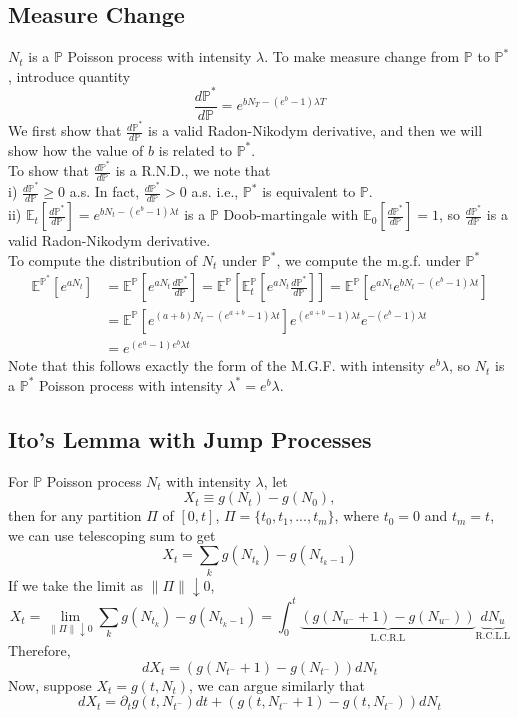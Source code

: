 \documentclass[a4paper]{article}
\begin{document}
\subsection{Measure Change}
$N_t$ is a $\mathbb{P}$ Poisson process with intensity $\lambda$. To make measure change from $\mathbb{P}$ to $\mathbb{P}^*$, introduce quantity 
$$\frac{d\mathbb{P}^*}{d\mathbb{P}} = e^{bN_T-(e^b-1)\lambda T}$$
We first show that $\frac{d\mathbb{P}^*}{d\mathbb{P}}$ is a valid Radon-Nikodym derivative, and then we will show how the value of $b$ is related to $\mathbb{P}^*$. \\
To show that $\frac{d\mathbb{P}^*}{d\mathbb{P}}$ is a R.N.D., we note that \\
i) $\frac{d\mathbb{P}^*}{d\mathbb{P}}\ge 0$ a.s. In fact, $ \frac{d\mathbb{P}^*}{d\mathbb{P}} > 0$ a.s. i.e., $\mathbb{P}^*$ is equivalent to $\mathbb{P}$. \\
ii) $\mathbb{E}_t\left[\frac{d\mathbb{P}^*}{d\mathbb{P}}\right]=e^{bN_t-(e^b-1)\lambda t}$ is a $\mathbb{P}$ Doob-martingale with $\mathbb{E}_0\left[\frac{d\mathbb{P}^*}{d\mathbb{P}}\right] = 1$, so $\frac{d\mathbb{P}^*}{d\mathbb{P}}$ is a valid Radon-Nikodym derivative.\\
To compute the distribution of $N_t$ under $\mathbb{P}^*$, we compute the m.g.f. under $\mathbb{P}^*$
\begin{align*}
\mathbb{E}^{\mathbb{P}^*}\left[e^{aN_t}\right]&=\mathbb{E}^\mathbb{P}\left[e^{aN_t}\frac{d\mathbb{P}^*}{d\mathbb{P}}\right]=\mathbb{E}^\mathbb{P}\left[\mathbb{E}^\mathbb{P}_t\left[e^{aN_t}\frac{d\mathbb{P}^*}{d\mathbb{P}}\right]\right]=\mathbb{E}^\mathbb{P}\left[e^{aN_t}e^{bN_t-(e^b-1)\lambda t}\right]\\
	&=\mathbb{E}^\mathbb{P}\left[e^{(a+b)N_t-(e^{a+b}-1)\lambda t}\right]e^{(e^{a+b}-1)\lambda t}e^{-(e^b-1)\lambda t}\\
	&=e^{(e^a-1)e^b\lambda t}
\end{align*}
Note that this follows exactly the form of the M.G.F. with intensity $e^b\lambda$, so $N_t$ is a $\mathbb{P}^*$ Poisson process with intensity $\lambda^*=e^b\lambda$. 

\subsection{Ito's Lemma with Jump Processes}
For $\mathbb{P}$ Poisson process $N_t$ with intensity $\lambda$, let $$X_t \equiv g(N_t)-g(N_0)  ,$$
then for any partition $\Pi$ of $[0,t]$,  $\Pi=\{t_0,t_1,...,t_m\}$, where $t_0 = 0$ and $t_m=t$, we can use telescoping sum to get
$$X_t = \sum_k g(N_{t_k})-g(N_{t_k-1})$$
If we take the limit as $\lVert \Pi\rVert\downarrow 0$, 
$$X_t = \lim_{\lVert\Pi\rVert\downarrow 0}\sum_k g(N_{t_k})-g(N_{t_k-1})=\int_0^t \underbrace{(g(N_{u^-}+1)-g(N_{u^-}))}_\text{L.C.R.L} \underbrace{dN_u}_{\text{R.C.L.L}} $$
Therefore, $$dX_t = (g(N_{t^-}+1)-g(N_{t^-}))dN_t$$
Now, suppose $X_t=g(t,N_t)$, we can argue similarly that $$dX_t = \partial_tg(t,N_{t^-})dt+(g(t,N_{t^-}+1)-g(t,N_{t^-}))dN_t$$
\end{document}
